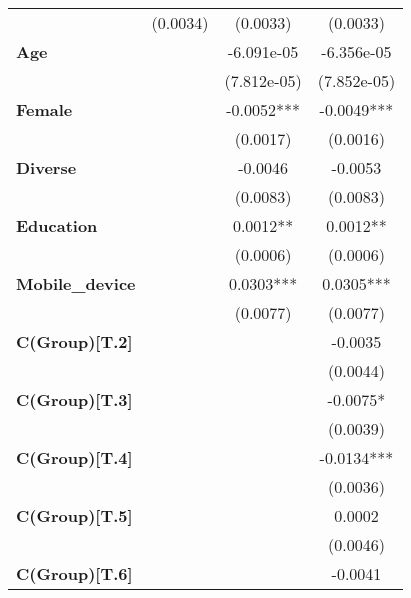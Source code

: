 \begin{center}
\begin{tabular}{lccc}
\textbf{ }                     &     (0.0034)     &     (0.0033)     &     (0.0033)      \\
\textbf{Age}                   &                  &    -6.091e-05    &    -6.356e-05     \\
\textbf{ }                     &                  &   (7.812e-05)    &   (7.852e-05)     \\
\textbf{Female}                &                  &    -0.0052***    &    -0.0049***     \\
\textbf{ }                     &                  &     (0.0017)     &     (0.0016)      \\
\textbf{Diverse}               &                  &     -0.0046      &     -0.0053       \\
\textbf{ }                     &                  &     (0.0083)     &     (0.0083)      \\
\textbf{Education}             &                  &     0.0012**     &     0.0012**      \\
\textbf{ }                     &                  &     (0.0006)     &     (0.0006)      \\
\textbf{Mobile\_device}        &                  &    0.0303***     &    0.0305***      \\
\textbf{ }                     &                  &     (0.0077)     &     (0.0077)      \\
\textbf{C(Group)[T.2]}         &                  &                  &     -0.0035       \\
\textbf{ }                     &                  &                  &     (0.0044)      \\
\textbf{C(Group)[T.3]}         &                  &                  &     -0.0075*      \\
\textbf{ }                     &                  &                  &     (0.0039)      \\
\textbf{C(Group)[T.4]}         &                  &                  &    -0.0134***     \\
\textbf{ }                     &                  &                  &     (0.0036)      \\
\textbf{C(Group)[T.5]}         &                  &                  &      0.0002       \\
\textbf{ }                     &                  &                  &     (0.0046)      \\
\textbf{C(Group)[T.6]}         &                  &                  &     -0.0041       \\

\end{tabular}
\end{center}
